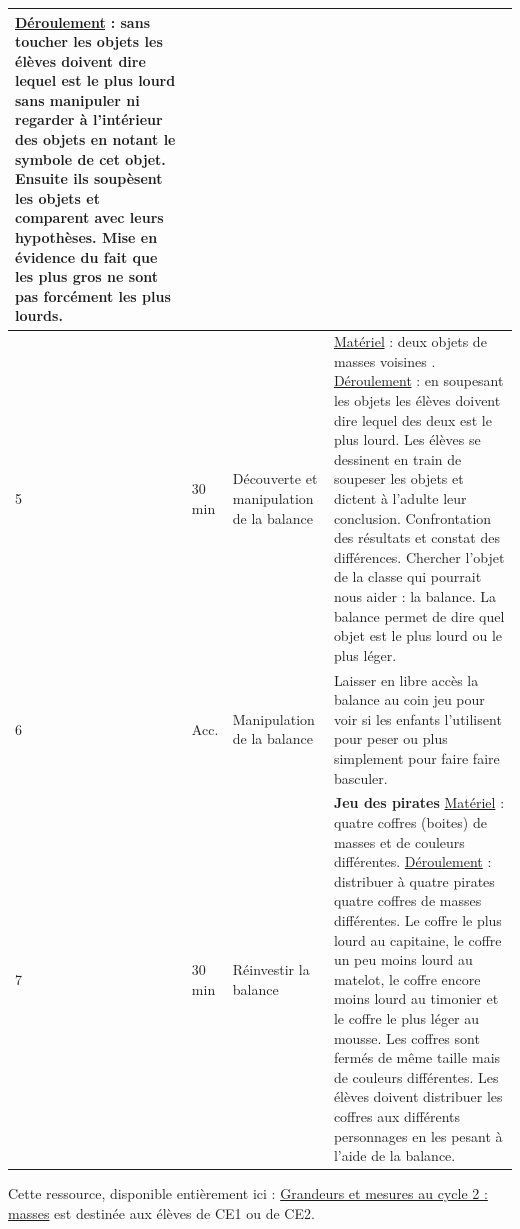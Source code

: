 {\begin{exercice*}
\begin{center}
\begin{tabular}{|p{0.2cm}|p{0.5cm}|p{2.3cm}|p{12.3cm}|}
   \uline{Déroulement\textcolor{white}{j}}: sans toucher les objets les élèves doivent dire lequel est le plus lourd sans manipuler ni regarder à l'intérieur des objets  en notant le symbole de cet objet. Ensuite ils soupèsent les objets et comparent avec leurs hypothèses. \newline
   Mise en évidence du fait que les plus gros ne sont pas forcément les plus lourds. \\
   \hline
   5 & 30 min & Découverte et \newline manipulation de la balance &
   \uline{Matériel\textcolor{white}{j}}: deux objets de masses voisines . \newline
   \uline{Déroulement\textcolor{white}{j}}: en soupesant les objets les élèves doivent dire lequel des deux est le plus lourd. Les élèves se dessinent en train de soupeser les objets et dictent à l'adulte leur conclusion. Confrontation des résultats et constat des différences. Chercher l'objet de la classe qui pourrait nous aider : la balance. La balance permet de dire quel objet est le plus lourd ou le plus léger. \\
   \hline
   6 & Acc. & Manipulation de la balance &
   Laisser en libre accès la balance au coin jeu pour voir si les enfants l'utilisent pour peser ou plus simplement pour faire faire basculer. \\
   \hline
   7 & 30 min & Réinvestir \newline la balance &
   {\bf Jeu des pirates} \newline
   \uline{Matériel} : quatre coffres (boites) de masses et de couleurs différentes. 
   \newline
   \uline{Déroulement} : distribuer à quatre pirates quatre coffres de masses différentes. Le coffre le plus lourd au capitaine, le coffre un peu moins lourd au matelot, le coffre encore moins lourd au timonier et le coffre le plus léger au mousse. Les coffres sont fermés de même taille mais de couleurs différentes. Les élèves doivent distribuer les coffres aux différents personnages en les pesant à l'aide de la balance. \\
   \hline
\end{tabular}
\end{center}
\end{exercice*}


\begin{exercice*}
   Cette ressource, disponible entièrement ici : \href{http://cache.media.education.gouv.fr/file/Mathematiques/25/8/RA16_C2_MATHS_grandeur_et_mesures_masses_635258.pdf}{Grandeurs et mesures au cycle 2 : masses} est destinée aux élèves de CE1 ou de CE2. \medskip
   

\end{exercice*}}
